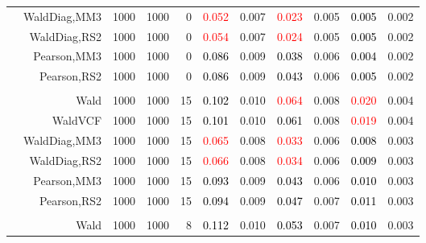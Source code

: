 \documentclass[
]{article}
\begin{document}
\begin{table}[H]
{\begin{tabular}[t]{lrrrrrrrlrr}
\hspace{1em} & WaldDiag,MM3 & 1000 & 1000 & 0 & \textcolor{red}{0.052} & 0.007 & \textcolor{red}{0.023} & 0.005 & \textcolor{black}{0.005} & 0.002\\

\hspace{1em} & WaldDiag,RS2 & 1000 & 1000 & 0 & \textcolor{red}{0.054} & 0.007 & \textcolor{red}{0.024} & 0.005 & \textcolor{black}{0.005} & 0.002\\

\hspace{1em} & Pearson,MM3 & 1000 & 1000 & 0 & \textcolor{black}{0.086} & 0.009 & \textcolor{black}{0.038} & 0.006 & \textcolor{black}{0.004} & 0.002\\

\hspace{1em} & Pearson,RS2 & 1000 & 1000 & 0 & \textcolor{black}{0.086} & 0.009 & \textcolor{black}{0.043} & 0.006 & \textcolor{black}{0.005} & 0.002\\
\cmidrule{1-11}
\addlinespace[0.3em]
\multicolumn{11}{l}{\textbf{1F 15V}}\\
\hspace{1em} & Wald & 1000 & 1000 & 15 & \textcolor{black}{0.102} & 0.010 & \textcolor{red}{0.064} & 0.008 & \textcolor{red}{0.020} & 0.004\\

\hspace{1em} & WaldVCF & 1000 & 1000 & 15 & \textcolor{black}{0.101} & 0.010 & \textcolor{black}{0.061} & 0.008 & \textcolor{red}{0.019} & 0.004\\

\hspace{1em} & WaldDiag,MM3 & 1000 & 1000 & 15 & \textcolor{red}{0.065} & 0.008 & \textcolor{red}{0.033} & 0.006 & \textcolor{black}{0.008} & 0.003\\

\hspace{1em} & WaldDiag,RS2 & 1000 & 1000 & 15 & \textcolor{red}{0.066} & 0.008 & \textcolor{red}{0.034} & 0.006 & \textcolor{black}{0.009} & 0.003\\

\hspace{1em} & Pearson,MM3 & 1000 & 1000 & 15 & \textcolor{black}{0.093} & 0.009 & \textcolor{black}{0.043} & 0.006 & \textcolor{black}{0.010} & 0.003\\

\hspace{1em} & Pearson,RS2 & 1000 & 1000 & 15 & \textcolor{black}{0.094} & 0.009 & \textcolor{black}{0.047} & 0.007 & \textcolor{black}{0.011} & 0.003\\
\cmidrule{1-11}
\addlinespace[0.3em]
\multicolumn{11}{l}{\textbf{2F 10V}}\\
\hspace{1em} & Wald & 1000 & 1000 & 8 & \textcolor{black}{0.112} & 0.010 & \textcolor{black}{0.053} & 0.007 & \textcolor{black}{0.010} & 0.003\\


\end{tabular}}
\end{table}
\end{document}
